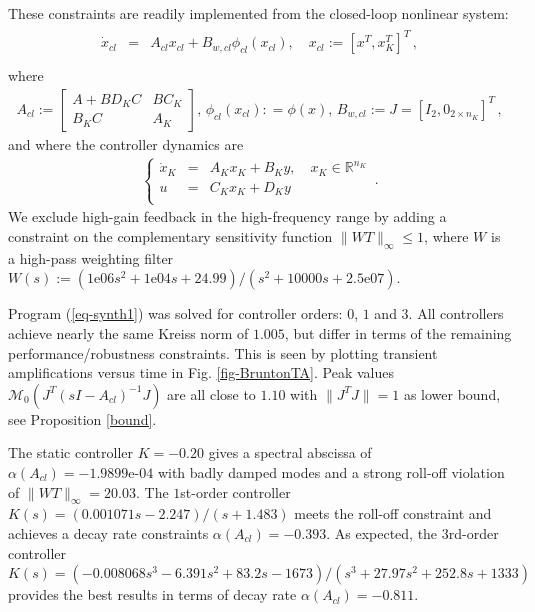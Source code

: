 \documentclass[12pt, a4paper,reqno]{amsart}
\theoremstyle{definition}
\begin{document}
These constraints  are readily implemented from the closed-loop nonlinear system: 
%
\begin{eqnarray}
\label{eq-CL1}
\begin{array}{lll}
\dot x_{cl} &=& A_{cl}  x_{cl} +  B_{w,cl} \phi_{cl}(x_{cl}),\quad  x_{cl}:= [x^T, x_K^T]^T\,, \\
    \end{array}
\end{eqnarray}
where  
\begin{eqnarray} 
\label{eq-CL2}
A_{cl} := \begin{bmatrix} A+B D_K C & B C_K \\ B_K C & A_K  \end{bmatrix}, \, 
\phi_{cl}(x_{cl}): = \phi(x), \, B_{w,cl}:= J=[I_2 ,0_{2 \times n_K}]^T \,,\end{eqnarray}
and where the controller dynamics are
%
\begin{eqnarray}
\label{eq-K1}
 \left\{   \begin{array}{lll}
\dot x_K \!\!&\!\!=&\!\! A_K x_K + B_K y, \quad x_K \in \mathbb R^{n_K} \\
 u \!\!&\!\! = &\!\! C_K x_K + D_K y\, \\
    \end{array} \right. \,.
\end{eqnarray}
%
We exclude high-gain feedback in the high-frequency range by adding a constraint on the complementary sensitivity function $\|WT\|_\infty\leq 1$, where $W$ is a high-pass weighting filter 
$W(s):= (1\text{e}06 s^2 + 1\text{e}04 s + 24.99)/(s^2 + 10000 s + 2.5\text{e}07)$.

Program (\ref{eq-synth1}) was solved for controller orders: $0$, $1$ and $3$. All controllers achieve 
nearly the same Kreiss norm of $1.005$, but differ in terms of the remaining performance/robustness constraints. 
This is seen by plotting  transient amplifications versus time  in Fig. \ref{fig-BruntonTA}.
Peak values $\mathcal M_0(J^T (sI-A_{cl})^{-1} J)$ are all close to $1.10$ with $\|J^T J\| = 1$ as lower bound, see Proposition \ref{bound}. 

The static controller $K = -0.20$ gives a spectral abscissa of $\alpha(A_{cl})= -1.9899\text{e-}04$ with badly damped modes and a strong roll-off violation of $\|WT\|_\infty = 20.03 $. The $1$st-order controller $K(s)= (0.001071 s - 2.247)/(s + 1.483)$  meets the roll-off constraint and achieves a decay rate constraints $\alpha(A_{cl})= -0.393$.
As expected, the $3$rd-order controller $K(s)=(-0.008068 s^3 - 6.391 s^2 + 83.2 s - 1673)/(s^3 + 27.97 s^2 + 252.8 s + 1333)$ provides the best results in terms of decay rate $\alpha(A_{cl})=-0.811$. 
\end{document}

